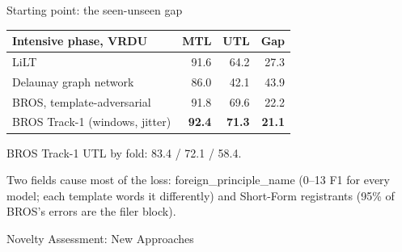 \documentclass[final]{beamer}
\renewcommand{\small}{\fontsize{19}{23.5}\selectfont}
\renewcommand{\scriptsize}{\fontsize{14}{16.6}\selectfont}
\newlength{\colwidth}\setlength{\colwidth}{25.9cm}
\newcommand{\hl}[1]{{\color{accent}\textbf{#1}}}
\begin{document}
\begin{frame}[t]
\begin{columns}[t]
\begin{column}{\colwidth}
\begin{block}{Starting point: the seen-unseen gap}
{\small
\begin{tabularx}{\linewidth}{@{}Lrrr@{}}
\toprule
Intensive phase, VRDU & MTL & UTL & Gap \\
\midrule
LiLT & 91.6 & 64.2 & 27.3 \\                          %
Delaunay graph network & 86.0 & 42.1 & 43.9 \\        %
BROS, template-adversarial & 91.8 & 69.6 & 22.2 \\                             %
BROS Track-1 (windows, jitter) & \textbf{92.4} & \textbf{71.3} & \textbf{21.1} \\ %
\bottomrule
\end{tabularx}}
{\scriptsize\color{muted}BROS Track-1 UTL by fold: 83.4 / 72.1 / 58.4.\par}
\vspace{0.5ex}
Two fields cause most of the loss: foreign\_principle\_name (0--13 F1 for every model; each template words it differently) and Short-Form registrants (95\% of BROS's errors are the filer block).
\end{block}

\begin{block}{Novelty Assessment: New Approaches}


\end{block}
\end{column}
\end{columns}
\end{frame}
\end{document}
